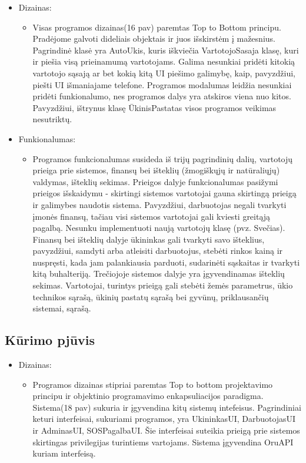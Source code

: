 \documentclass[oneside]{VUMIFPSkursinis}
\begin{document}
	\begin{itemize}
		\item Dizainas:
			\begin{itemize}
				\item Visas programos dizainas(16 pav) paremtas Top to Bottom principu. Pradėjome galvoti dideliais objektais ir juos išskirstėm į mažesnius. Pagrindinė klasė yra AutoUkis, kuris iškviečia VartotojoSasaja klasę, kuri ir piešia visą prieinamumą vartotojams. Galima nesunkiai pridėti kitokią vartotojo sąsają ar bet kokią kitą UI piešimo galimybę, kaip, pavyzdžiui, piešti UI išmaniajame telefone. Programos modalumas leidžia nesunkiai pridėti funkionalumo, nes programos dalys yra atskiros viena nuo kitos. Pavyzdžiui, ištrynus klasę ŪkinisPastatas visos programos veikimas nesutriktų. 
			\end{itemize}
		\item Funkionalumas: 
			\begin{itemize}
				\item Programos funkcionalumas susideda iš trijų pagrindinių dalių, vartotojų prieiga prie sistemos, finansų bei išteklių (žmogiškųjų ir natūraliųjų) valdymas, išteklių sekimas. Prieigos dalyje funkcionalumas pasižymi prieigos išskaidymu - skirtingi sistemos vartotojai gauna skirtingą prieigą ir galimybes naudotis sistema. Pavyzdžiui, darbuotojas negali tvarkyti įmonės finansų, tačiau visi sistemos vartotojai gali kviesti greitąją pagalbą. Nesunku implementuoti naują vartotojų klasę (pvz. Svečias). Finansų bei išteklių dalyje ūkininkas gali tvarkyti savo išteklius, pavyzdžiui, samdyti arba atleisiti darbuotojus, stebėti rinkos kainą ir nuspręsti, kada jam palankiausia parduoti, sudarinėti sąskaitas ir tvarkyti kitą buhalteriją. Trečiojoje sistemos dalyje yra įgyvendinamas išteklių sekimas. Vartotojai, turintys prieigą gali stebėti žemės parametrus, ūkio technikos sąrašą, ūkinių pastatų sąrašą bei gyvūnų, priklausančių sistemai, sąrašą.
			\end{itemize}

	\end{itemize}

\pagebreak

\subsection{Kūrimo pjūvis}
	\begin{itemize}
		\item Dizainas:
		\begin{itemize}
			\item Programos dizainas stipriai paremtas Top to bottom projektavimo principu ir objektinio programavimo enkapsuliacijos paradigma. Sistema(18 pav) sukuria ir įgyvendina kitų sistemų intefeisus. Pagrindiniai keturi interfeisai, sukuriami programos, yra UkininkasUI, DarbuotojasUI ir AdminasUI, SOSPagalbaUI. Šie interfeisai suteikia prieigą prie sistemos skirtingas privilegijas turintiems vartojams. Sistema įgyvendina OruAPI kuriam interfeisą.

		\end{itemize}
	\end{itemize}
\end{document}
